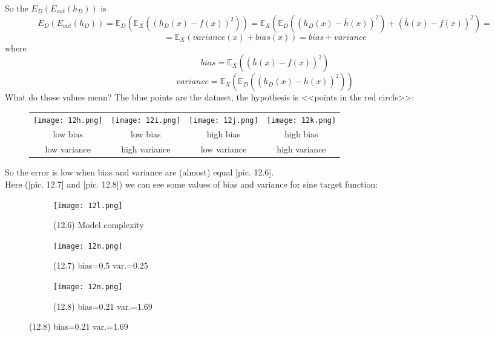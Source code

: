 So the $E_D\left(E_{out}(h_D)\right)$ is
$$E_D\left(E_{out}(h_D)\right)=\mathbb{E}_D\left(\mathbb{E}_X\left(\left(h_D(x)-f(x)\right)^2\right)\right)=\mathbb{E}_X\left(\mathbb{E}_D\left(\left(h_D(x)-\overline{h}(x)\right)^2\right)+\left(\overline{h}(x)-f(x)\right)^2\right)=$$
$$=\mathbb{E}_X(variance(x)+bias(x))=bias+variance$$
where
$$bias=\mathbb{E}_X\left(\left(\overline{h}(x)-f(x)\right)^2\right)$$
$$variance=\mathbb{E}_X\left(\mathbb{E}_D\left(\left(h_D(x)-\overline{h}(x)\right)^2\right)\right)$$
What do those values mean? The blue points are the dataset, the hypothesis is <<points in the red circle>>:
\begin{figure}[H]
  \centering
  \begin{tabular}{cccc}
    \texttt{[image: 12h.png]} & \hspace{0.25cm}
    \texttt{[image: 12i.png]} & \hspace{0.25cm}
    \texttt{[image: 12j.png]} & \hspace{0.25cm}
    \texttt{[image: 12k.png]} \\
    low bias & low bias & high bias & high bias \\
    low variance & high variance & low variance & high variance \\
  \end{tabular}
\end{figure}
So the error is low when bias and variance are (almost) equal [pic. 12.6].\\
Here ([pic. 12.7] and [pic. 12.8]) we can see some values of bias and variance for sine target function:
\begin{figure}[H]
  \centering
  \begin{subfigure}[c]{0.36\linewidth}
    \texttt{[image: 12l.png]}
    \caption*{(12.6) Model complexity}
  \end{subfigure}
  \hspace{0.4cm}
  \begin{subfigure}[c]{0.28\linewidth}
    \texttt{[image: 12m.png]}
    \caption*{(12.7) bias=0.5 var.=0.25}
  \end{subfigure}
  \hspace{0.4cm}
  \begin{subfigure}[c]{0.28\linewidth}
    \texttt{[image: 12n.png]}
    \caption*{(12.8) bias=0.21 var.=1.69}
  \end{subfigure}
\end{figure}

